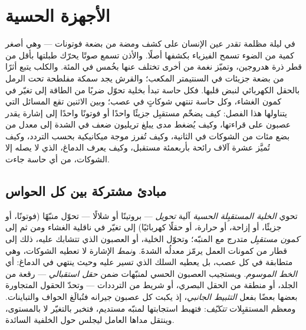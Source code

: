 \chapter{الأجهزة الحسية}\label{ch:b3:sensory-systems}

في ليلة مظلمة تقدر عين الإنسان على كشف ومضة من بضعة فوتونات
--- وهي أصغر كمية من الضوء تسمح الفيزياء بكشفها أصلًا.
والأذن تسمع صوتًا يحرّك طبلتها بأقل من قطر ذرة هدروجين،
وتميّز نغمة من أخرى تختلف عنها بخُمس في المئة. والكلب يتبع
أثرًا من بضعة جزيئات في السنتيمتر المكعب؛ والقرش يجد سمكة
مفلطحة تحت الرمل بالحقل الكهربائي لنبض قلبها. فكل حاسة تبدأ
بخلية تحوّل ضربًا من الطاقة إلى تغيّر في كمون الغشاء، وكل
حاسة تنتهي شوكاتٍ في عصب؛ وبين الاثنين تقع المسائل التي
يتناولها هذا الفصل: كيف يضخّم مستقبِل جزيئًا واحدًا أو
فوتونًا واحدًا إلى إشارة يقدر عصبون على قراءتها، وكيف يُضغط
مدى يبلغ تريليون ضعف في الشدة إلى معدل من بضع مئات من
الشوكات في الثانية، وكيف تُفرز موجة ميكانيكية بحسب التردد،
وكيف تُميَّز عشرة آلاف رائحة بأربعمئة مستقبل، وكيف يعرف
الدماغ، الذي لا يصله إلا الشوكات، من أي حاسة جاءت.

\section{مبادئ مشتركة بين كل الحواس}

\begin{definition}\label{def:b3:sensory-systems:principles}
تحوي \emph{الخلية المستقبِلة الحسية} آلية \emph{تحويل} ---
بروتينًا أو شلالًا --- تحوّل منبّهًا (فوتونًا، أو جزيئًا، أو
إزاحة، أو حرارة، أو حقلًا كهربائيًا) إلى تغيّر في ناقلية
الغشاء ومن ثم إلى \emph{كمون مستقبِل} متدرج مع المنبّه؛
وتحوّل الخلية، أو العصبون الذي تتشابك عليه، ذلك إلى قطار من
كمونات العمل يرمّز معدلُه الشدةَ. و\emph{نمط} الإشارة لا
تعطيه الشوكات، وهي متطابقة في كل عصب، بل يعطيه السلك الذي
تسير عليه وحيث ينتهي في الدماغ: أي \emph{الخط الموسوم}.
ويستجيب العصبون الحسي لمنبّهات ضمن \emph{حقل استقبالي} ---
رقعة من الجلد، أو منطقة من الحقل البصري، أو شريط من
الترددات --- وتحدّ الحقول المتجاورة بعضها بعضًا
بفعل \emph{التثبيط الجانبي}، إذ يكبت كل عصبون جيرانه فتُبالَغ
الحواف والتباينات. ومعظم المستقبِلات \emph{تتكيّف}: فتهبط
استجابتها لمنبّه مستديم، فتخبر بالتغيّر لا بالمستوى، وينتقل
مداها العامل ليجلس حول الخلفية السائدة.
\end{definition}

